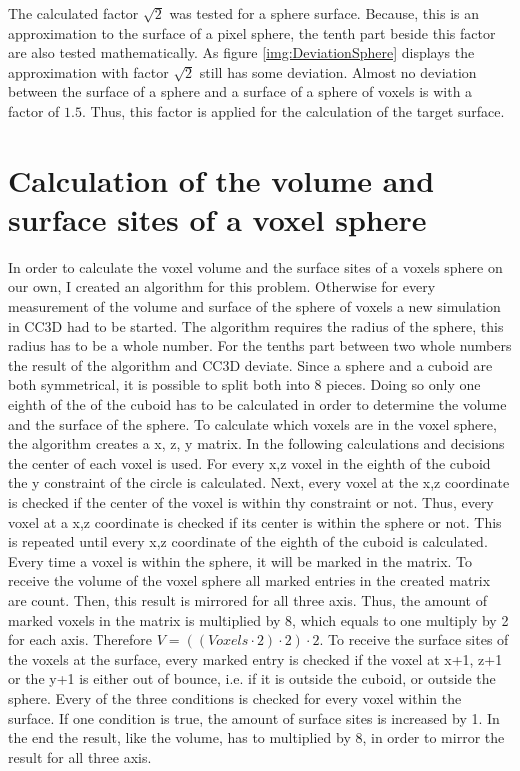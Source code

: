 The calculated factor $\sqrt{2}$ was tested for a sphere surface. Because, this is an approximation to the surface of a pixel sphere, the tenth part beside this factor are also tested mathematically. As figure \ref{img:DeviationSphere} displays the  approximation with factor $\sqrt{2}$ still has some deviation. Almost no deviation between the surface of a sphere and a surface of a sphere of voxels is with a factor of $1.5$. Thus, this factor is applied for the calculation of the target surface. 

\section{Calculation of the volume and surface sites of a voxel sphere}
In order to calculate the voxel volume and the surface sites of a voxels sphere on our own, I created an algorithm for this problem. Otherwise for every measurement of the volume and surface of the sphere of voxels a new simulation in \ac{CC3D} had to be started. \newline
The algorithm requires the radius of the sphere, this radius has to be a whole number. For the tenths part between two whole numbers the result of the algorithm and \ac{CC3D} deviate.
Since a sphere and a cuboid are both symmetrical, it is possible to split both into 8 pieces. Doing so only one eighth of the of the cuboid has to be calculated in order to determine the volume and the surface of the sphere. \newline
To calculate which voxels are in the voxel sphere, the algorithm creates a x, z, y matrix. In the following calculations and decisions the center of each voxel is used. For every x,z voxel in the eighth of the cuboid the y constraint of the circle is calculated. Next, every voxel at the x,z coordinate is checked if the center of the voxel is within thy constraint or not. Thus, every voxel at a x,z coordinate is checked if its center is within the sphere or not. This is repeated until every x,z coordinate of the eighth of the cuboid is calculated. Every time a voxel is within the sphere, it will be marked in the matrix.  \newline
To receive the volume of the voxel sphere all marked entries in the created matrix are count. Then, this result is mirrored for all three axis. Thus, the amount of marked voxels in the matrix is multiplied by 8, which equals to one multiply by 2 for each axis. Therefore $V=((Voxels \cdot 2) \cdot 2) \cdot 2$.
To receive the surface sites of the voxels at the surface, every marked entry is checked if the voxel at x+1, z+1 or the y+1 is either out of bounce, i.e. if it is outside the cuboid, or outside the sphere. Every of the three conditions is checked for every voxel within the surface. If one condition is true, the amount of surface sites is increased by 1. In the end the result, like the volume, has to multiplied by 8, in order to mirror the result for all three axis.



